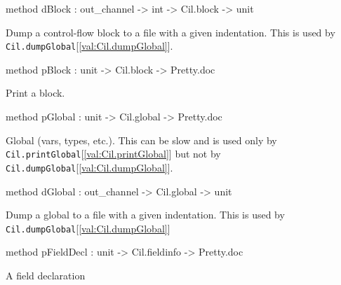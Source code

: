\documentclass[11pt]{article}
\begin{document}
\begin{ocamldocobjectend}
\begin{ocamldocdescription}
\end{ocamldocdescription}


\label{method:Cil.cilPrinter.dBlock}\begin{ocamldoccode}
method dBlock : out_channel -> int -> Cil.block -> unit
\end{ocamldoccode}
\begin{ocamldocdescription}
Dump a control-flow block to a file with a given indentation. 
 This is used by {\tt{Cil.dumpGlobal}}[\ref{val:Cil.dumpGlobal}].


\end{ocamldocdescription}


\label{method:Cil.cilPrinter.pBlock}\begin{ocamldoccode}
method pBlock : unit -> Cil.block -> Pretty.doc
\end{ocamldoccode}
\begin{ocamldocdescription}
Print a block.


\end{ocamldocdescription}


\label{method:Cil.cilPrinter.pGlobal}\begin{ocamldoccode}
method pGlobal : unit -> Cil.global -> Pretty.doc
\end{ocamldoccode}
\begin{ocamldocdescription}
Global (vars, types, etc.). This can be slow and is used only by 
 {\tt{Cil.printGlobal}}[\ref{val:Cil.printGlobal}] but not by {\tt{Cil.dumpGlobal}}[\ref{val:Cil.dumpGlobal}].


\end{ocamldocdescription}


\label{method:Cil.cilPrinter.dGlobal}\begin{ocamldoccode}
method dGlobal : out_channel -> Cil.global -> unit
\end{ocamldoccode}
\begin{ocamldocdescription}
Dump a global to a file with a given indentation. This is used by 
 {\tt{Cil.dumpGlobal}}[\ref{val:Cil.dumpGlobal}]


\end{ocamldocdescription}


\label{method:Cil.cilPrinter.pFieldDecl}\begin{ocamldoccode}
method pFieldDecl : unit -> Cil.fieldinfo -> Pretty.doc
\end{ocamldoccode}
\begin{ocamldocdescription}
A field declaration



\end{ocamldocdescription}
\end{ocamldocobjectend}
\end{document}
